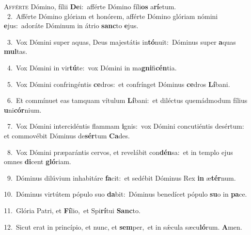 \lettrine{\initial\textcolor{\initialcolor}{A}}{fférte} Dómino, fílii \textbf{De}\-i:~\star afférte Dómino fíli\textbf{os} a\-\textbf{rí}\-etum.\\
{\numbfont\textcolor{\numbcolor}{~2.}}~Afférte Dómino glóriam et honórem, afférte Dómino glóriam nómini \textbf{e}\-jus:~\star adoráte Dóminum in átrio \textbf{sanc}\-to \textbf{e}\-jus.\par
{\numbfont\textcolor{\numbcolor}{~3.}}~Vox Dómini super aquas, Deus majestátis in\-\textbf{tó}\-nuit:~\star Dóminus super \textbf{a}\-quas \textbf{mul}\-tas.\par
{\numbfont\textcolor{\numbcolor}{~4.}}~Vox Dómini in vir\-\textbf{tú}\-te:~\star vox Dómini in ma\-\textbf{gni}\-fi\-\textbf{cén}\-tia.\par
{\numbfont\textcolor{\numbcolor}{~5.}}~Vox Dómini confringéntis \textbf{ce}\-dros:~\star et confrínget Dóminus \textbf{ce}\-dros \textbf{Lí}\-bani.\par
{\numbfont\textcolor{\numbcolor}{~6.}}~Et commínuet eas tamquam vítulum \textbf{Lí}\-bani:~\star et diléctus quemádmodum fílius \textbf{u}\-ni\-\textbf{cór}\-nium.\par
{\numbfont\textcolor{\numbcolor}{~7.}}~Vox Dómini intercidéntis flammam \textbf{i}\-gnis:~\star vox Dómini concutiéntis desértum: et commovébit Dóminus de\-\textbf{sér}\-tum \textbf{Ca}\-des.\par
{\numbfont\textcolor{\numbcolor}{~8.}}~Vox Dómini præparántis cervos, et revelábit con\-\textbf{dén}\-sa:~\star et in templo ejus omnes \textbf{di}\-cent \textbf{gló}\-riam.\par
{\numbfont\textcolor{\numbcolor}{~9.}}~Dóminus dilúvium inhabitáre \textbf{fa}\-cit:~\star et sedébit Dóminus Rex \textbf{in} æ\-\textbf{tér}\-num.\par
{\numbfont\textcolor{\numbcolor}{10.}}~Dóminus virtútem pópulo suo \textbf{da}\-bit:~\star Dóminus benedícet pópulo \textbf{su}\-o in \textbf{pa}\-ce.\par
{\numbfont\textcolor{\numbcolor}{11.}}~Glória Patri, et \textbf{Fí}\-lio,~\star et Spi\-\textbf{rí}\-tui \textbf{Sanc}\-to.\par
{\numbfont\textcolor{\numbcolor}{12.}}~Sicut erat in princípio, et nunc, et \textbf{sem}\-per,~\star et in sǽcula sæcu\-\textbf{ló}\-rum. \textbf{A}\-men.\par
